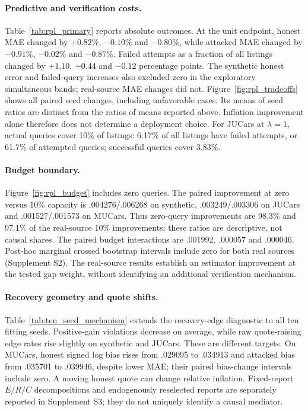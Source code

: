 \documentclass[11pt]{article}
\begin{document}
\paragraph{Predictive and verification costs.}
Table~\ref{tab:rpl_primary} reports absolute outcomes. At the unit endpoint,
honest MAE changed by $+0.82\%$, $-0.10\%$ and $-0.80\%$, while attacked MAE
changed by $-0.91\%$, $-0.02\%$ and $-0.87\%$. Failed attempts as a fraction of all listings
changed by $+1.10$, $+0.44$ and $-0.12$ percentage points. The synthetic honest
error and failed-query increases also excluded zero in the exploratory
simultaneous bands; real-source MAE changes did not. Figure~\ref{fig:rpl_tradeoffs}
shows all paired seed changes, including unfavorable cases. Its means of seed
ratios are distinct from the ratios of means reported above. Inflation
improvement alone therefore does not determine a deployment choice. For JUCars at $\lambda=1$, actual queries cover 10\% of listings: 6.17\% of all listings have failed attempts, or 61.7\% of attempted queries; successful queries cover 3.83\%.

\paragraph{Budget boundary.}
Figure~\ref{fig:rpl_budget} includes zero queries. The paired improvement
at zero versus 10\% capacity is .004276/.006268 on synthetic,
.003249/.003306 on JUCars and .001527/.001573 on MUCars. Thus zero-query
improvements are 98.3\% and 97.1\% of the real-source 10\% improvements;
these ratios are descriptive, not causal shares. The paired budget
interactions are .001992, .000057 and .000046. Post-hoc marginal crossed
bootstrap intervals include zero for both real sources (Supplement S2).
The real-source results establish an estimator improvement at the tested
gap weight, without identifying an additional verification mechanism.

\paragraph{Recovery geometry and quote shifts.}
Table~\ref{tab:ten_seed_mechanism} extends the recovery-edge diagnostic to
all ten fitting seeds. Positive-gain violations decrease on average, while
raw quote-raising edge rates rise slightly on synthetic and JUCars. These
are different targets. On MUCars, honest signed log bias rises from .029095
to .034913 and attacked bias from .035701 to .039946, despite lower MAE;
their paired bias-change intervals include zero. A moving honest quote can
change relative inflation. Fixed-report $E/R/C$ decompositions and
endogenously reselected reports are separately reported in Supplement S3;
they do not uniquely identify a causal mediator.
\end{document}
